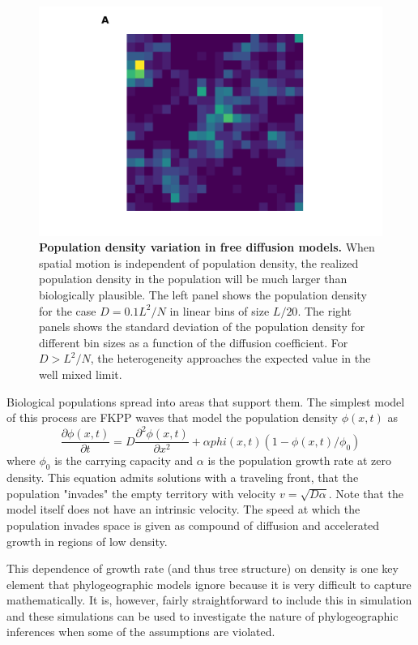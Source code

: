 \documentclass[aps,rmp, onecolumn]{revtex4}
\begin{document}
\begin{figure}
    \includegraphics*[width=\textwidth]{figures/heterogeneity_free_diffusion.pdf}
    \caption[short]{\label{fig:heterogeneity}{\bf Population density variation in free diffusion models.}
    When spatial motion is independent of population density, the realized population density in the population will be much larger than biologically plausible. The left panel shows the population density for the case $D = 0.1 L^2/N$ in linear bins of size $L/20$. The right panels shows the standard deviation of the population density for different bin sizes as a function of the diffusion coefficient. For $D>L^2/N$, the heterogeneity approaches the expected value in the well mixed limit. }
\end{figure}

Biological populations spread into areas that support them.
The simplest model of this process are FKPP waves that model the population density $\phi(x,t)$ as
\begin{equation}
    \frac{\partial \phi(x,t)}{\partial t} = D\frac{\partial^2 \phi(x,t)}{\partial x^2} + \alpha phi(x,t)(1-\phi(x,t)/\phi_0)
\end{equation}
where $\phi_0$ is the carrying capacity and $\alpha$ is the population growth rate at zero density.
This equation admits solutions with a traveling front, that the population "invades" the empty territory with velocity $v = \sqrt{D \alpha}$.
Note that the model itself does not have an intrinsic velocity.
The speed at which the population invades space is given as compound of diffusion and accelerated growth in regions of low density.

This dependence of growth rate (and thus tree structure) on density is one key element that phylogeographic models ignore because it is very difficult to capture mathematically.
It is, however, fairly straightforward to include this in simulation and these simulations can be used to investigate the nature of phylogeographic inferences when some of the assumptions are violated.
\end{document}

